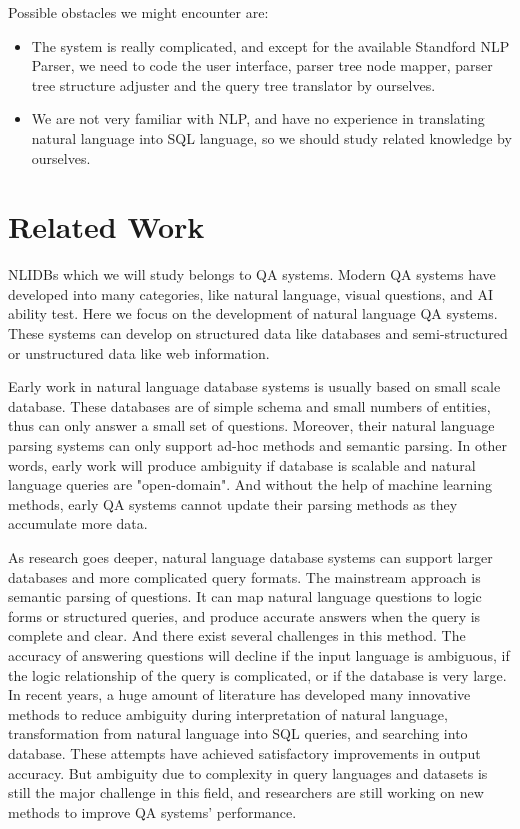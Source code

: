 \documentclass[twocolumn]{article}
\begin{document}
Possible obstacles we might encounter are:
\begin{itemize}
\item The system is really complicated, and except for the available Standford NLP Parser, we need to code the user interface, parser tree node mapper, parser tree structure adjuster and the query tree translator by ourselves.
\item We are not very familiar with NLP, and have no experience in translating natural language into SQL language, so we should study related knowledge by ourselves.
\end{itemize}

\section{Related Work}
NLIDBs which we will study belongs to QA systems. Modern QA systems have developed into many categories, like natural language, visual questions, and AI ability test. Here we focus on the development of natural language QA systems. These systems can develop on structured data like databases and semi-structured or unstructured data like web information. \cite{QATutorial}
      
Early work in natural language database systems is usually based on small scale database. These databases are of simple schema and small numbers of entities, thus can only answer a small set of questions. Moreover, their natural language parsing systems can only support ad-hoc methods and semantic parsing. In other words, early work will produce ambiguity if database is scalable and natural language queries are "open-domain". And without the help of machine learning methods, early QA systems cannot update their parsing methods as they accumulate more data.
      
As research goes deeper, natural language database systems can support larger databases and more complicated query formats. The mainstream approach is semantic parsing of questions. It can map natural language questions to logic forms or structured queries, and produce accurate answers when the query is complete and clear. And there exist several challenges in this method. The accuracy of answering questions will decline if the input language is ambiguous, if the logic relationship of the query is complicated, or if the database is very large. In recent years, a huge amount of literature has developed many innovative methods to reduce ambiguity during interpretation of natural language, transformation from natural language into SQL queries, and searching into database. These attempts have achieved satisfactory improvements in output accuracy. But ambiguity due to complexity in query languages and datasets is still the major challenge in this field, and researchers are still working on new methods to improve QA systems' performance.
      
\end{document}
